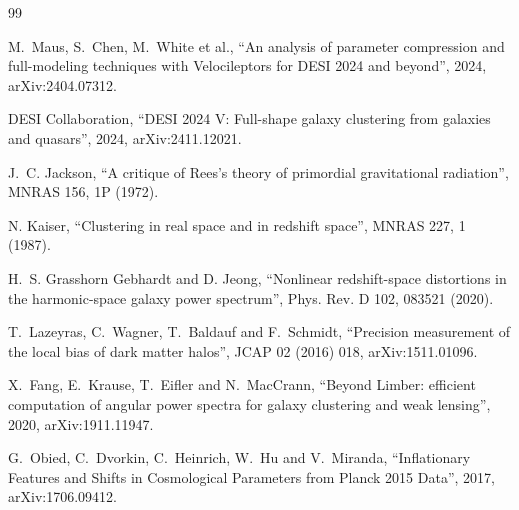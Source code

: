\documentclass[11pt]{article}
\begin{document}
\begin{thebibliography}{99}

M.~Maus, S.~Chen, M.~White et al.,
``An analysis of parameter compression and full-modeling techniques
with Velocileptors for DESI 2024 and beyond'',
2024, arXiv:2404.07312.

DESI Collaboration,
``DESI 2024 V: Full-shape galaxy clustering from galaxies and
quasars'',
2024, arXiv:2411.12021.

J.~C. Jackson,
``A critique of Rees's theory of primordial gravitational radiation'',
MNRAS 156, 1P (1972).

N. Kaiser,
``Clustering in real space and in redshift space'',
MNRAS 227, 1 (1987).

H.~S. Grasshorn Gebhardt and D. Jeong,
``Nonlinear redshift-space distortions in the harmonic-space galaxy
power spectrum'',
Phys. Rev. D 102, 083521 (2020).

T.~Lazeyras, C.~Wagner, T.~Baldauf and F.~Schmidt,
``Precision measurement of the local bias of dark matter halos'',
JCAP 02 (2016) 018, arXiv:1511.01096.

X.~Fang, E.~Krause, T.~Eifler and N.~MacCrann,
``Beyond Limber: efficient computation of angular power spectra for
galaxy clustering and weak lensing'',
2020, arXiv:1911.11947.

G.~Obied, C.~Dvorkin, C.~Heinrich, W.~Hu and V.~Miranda,
``Inflationary Features and Shifts in Cosmological Parameters from
Planck 2015 Data'',
2017, arXiv:1706.09412.

\end{thebibliography}
\end{document}
